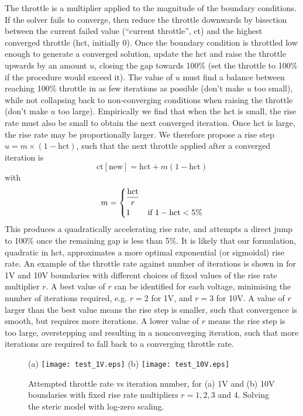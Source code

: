 The throttle is a multiplier
applied to the magnitude of the boundary conditions.
If the solver fails to converge, then reduce the throttle downwards by
bisection between the current failed value (``current throttle'', ct) and the highest converged
throttle (hct, initially 0). Once the boundary
condition is throttled low enough to generate a converged solution,
update the hct and raise
the throttle upwards by an amount $u$, closing the gap towards 100\% (set the throttle
to 100\% if the procedure would exceed it).  The value of $u$
must find a balance between reaching 100\% throttle in as few
iterations as possible (don't make $u$ too small), while not collapsing back to non-converging
conditions when raising the throttle (don't make $u$ too
large). Empirically we find that when the hct is small, the rise rate
must also be small to obtain the next converged iteration. Once hct is
large, the rise rate may be proportionally larger. We therefore
propose a rise step $u=m\times (1- \mathrm{hct})$, such that the next
throttle applied after a converged iteration is
\begin{equation}
  \mathrm{ct [new]} = \mathrm{hct} + m (1-\mathrm{hct})
\end{equation}
with
\begin{equation}
  m=
  \begin{dcases}
    \frac{\mathrm{hct}}{r} & \\
    1 & \text{if } 1-\mathrm{hct} < 5\%
  \end{dcases}
\end{equation}
This produces a quadratically accelerating rise rate,  and attempts a
direct jump to 100\% once the remaining gap is less than 5\%.  It is likely
that our formulation, quadratic in hct, approximates a more 
optimal exponential (or
sigmoidal) rise rate.
An example of
the  throttle rate against number of iterations is shown in
 for 1V and 10V boundaries with different
choices of fixed values of the rise rate multiplier $r$. A best value of $r$ can be identified
for each voltage, minimising the number of iterations required,
e.g. $r=2$ for 1V, and $r=3$ for 10V. A
value of $r$ larger than the best value means the rise step is
smaller, such that convergence is smooth, but requires more
iterations. A lower value of $r$ means the rise step is too large,
overstepping and resulting in a nonconverging iteration, such that
more iterations are required to fall back to a converging throttle rate.

\begin{figure}
\centering
(a)
\texttt{[image: test\_1V.eps]}
(b)
\texttt{[image: test\_10V.eps]}
\caption{Attempted throttle rate vs iteration number, for (a) 1V and
  (b) 10V  boundaries with fixed rise rate multipliers $r=1,2,3$ and
  4. Solving the steric model with log-zero scaling.
}
\label{fig:throttle_rate}
\end{figure}

